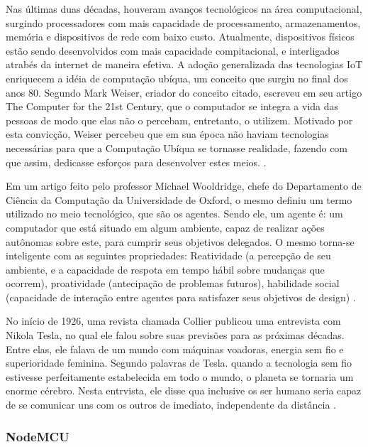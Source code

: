 \documentclass[journal]{IEEEtran}
\begin{document}
Nas últimas duas décadas, houveram avanços tecnológicos na área computacional, surgindo processadores com mais capacidade de processamento, armazenamentos, memória e dispositivos de rede com baixo custo. Atualmente, dispositivos físicos estão sendo desenvolvidos com mais capacidade compitacional, e interligados atrabés da internet de maneira efetiva. A adoção generalizada das tecnologias IoT enriquecem a idéia de computação ubíqua, um conceito que surgiu no final dos anos 80. Segundo Mark Weiser,  criador do conceito citado, escreveu em seu artigo The Computer for the 21st Century, que o computador se integra a vida das pessoas de modo que elas não o percebam, entretanto, o utilizem. Motivado por esta convicção, Weiser percebeu que em sua época não haviam tecnologias necessárias para que a Computação Ubíqua se tornasse realidade, fazendo com que assim, dedicasse esforços para desenvolver estes meios.  \cite{MarkWeiser}.

Em um artigo feito pelo professor Michael Wooldridge, chefe do Departamento de Ciência da Computação da Universidade de Oxford, o mesmo definiu um termo utilizado no meio tecnológico, que são os agentes. Sendo ele, um agente é: um computador que está situado em algum ambiente, capaz de realizar ações autônomas sobre este, para cumprir seus objetivos delegados. O mesmo torna-se inteligente com as seguintes propriedades: Reatividade (a percepção de seu ambiente, e a capacidade de respota em tempo hábil sobre mudanças que ocorrem), proatividade (antecipação de problemas futuros), habilidade social (capacidade de interação entre agentes para satisfazer seus objetivos de design) \cite{MichaelWooldridge}.

No início de 1926, uma revista chamada Collier publicou uma entrevista com Nikola Tesla, no qual ele falou sobre suas previsões para as próximas décadas. Entre elas, ele falava de um mundo com máquinas voadoras, energia sem fio e superioridade feminina. Segundo palavras de Tesla. quando a tecnologia sem fio estivesse perfeitamente estabelecida em todo o mundo, o planeta se tornaria um enorme cérebro. Nesta entrvista, ele disse qua inclusive os ser humano seria capaz de se comunicar uns com os outros de imediato, independente da distância \cite{johnBKennedy}.

\subsubsection{NodeMCU}
\end{document}
